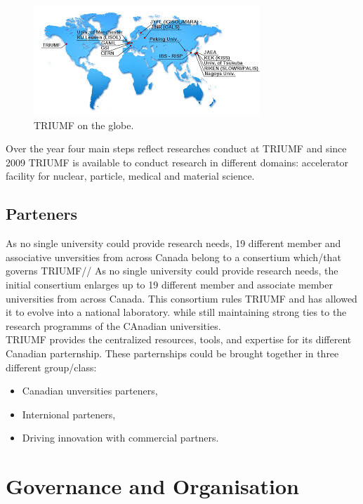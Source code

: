 \documentclass[a4paper, 11pt]{report}%
\begin{document}
  \begin{figure}[!hbtp]
  \centering
  \includegraphics[trim=1.5cm 2cm 5.5cm 3cm, clip=true,totalheight=.4\textwidth]{../Pictures/TRIUMF_localisation.jpg}%
  \caption{TRIUMF on the  globe.}
  \label{fig:TRIUMF_localisation}
  \end{figure}
  
  Over the year four main steps reflect researches conduct at TRIUMF and since 2009 TRIUMF is available to conduct research in different domains: 
  accelerator facility for nuclear, particle, medical and material science. 
  
  \subsection{Parteners}
  
  As no single university could provide research needs, 19 different member and associative unversities from across Canada belong to a consertium
  which/that governs TRIUMF// As no single university could provide research needs, the initial consertium enlarges up to 19 different 
  member and associate member universities from across Canada. This consortium rules TRIUMF and has allowed it to evolve into a national 
  laboratory. while still maintaining strong ties to the research programms of the CAnadian universities. 
  \\
  
  TRIUMF provides the centralized resources, tools, and expertise for its different Canadian parternship. These parternships could be 
  brought together in three different group/class: 
  \begin{itemize}
  \item Canadian unversities parteners,  
  \item Internional parteners,   
  \item Driving innovation with commercial partners. 
  \end{itemize}
  
  \section{Governance and Organisation}
  
\end{document}
